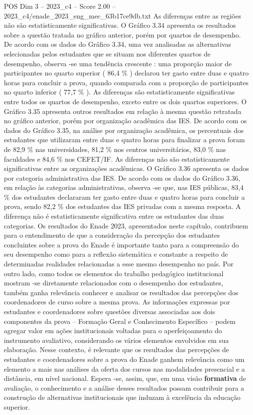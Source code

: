 \begin{textsample}{POS Dim 3 – 2023\_c4 – Score 2.00 – 2023\_c4/enade\_2023\_eng\_mec\_63b17ce9db.txt}
As diferenças entre as regiões não são estatisticamente significativas.
O Gráfico 3.34 apresenta os resultados sobre a questão tratada no gráfico anterior, porém por quartos de desempenho.
De acordo com os dados do Gráfico 3.34, uma vez analisadas as alternativas selecionadas pelos estudantes que se situam nos diferentes quartos de desempenho, observa -se uma tendência crescente : uma proporção maior de participantes no quarto superior ( 86,4 \% ) declarou ter gasto entre duas e quatro horas para concluir a prova, quando comparada com a proporção de participantes no quarto inferior ( 77,7 \% ).
As diferenças são estatisticamente significativas entre todos os quartos de desempenho, exceto entre os dois quartos superiores.
O Gráfico 3.35 apresenta outros resultados em relação à mesma questão retratada no gráfico anterior, porém por organização acadêmica das IES.
De acordo com os dados do Gráfico 3.35, na análise por organização acadêmica, os percentuais dos estudantes que utilizaram entre duas e quatro horas para finalizar a prova foram de 82,9 \% nas universidades, 81,2 \% nos centros universitários, 83,0 \% nas faculdades e 84,6 \% nos CEFET/IF.
As diferenças não são estatisticamente significativas entre as organizações acadêmicas.
O Gráfico 3.36 apresenta os dados por categoria administrativa das IES.
De acordo com os dados do Gráfico 3.36, em relação às categorias administrativas, observa -se que, nas IES públicas, 83,4 \% dos estudantes declararam ter gasto entre duas e quatro horas para concluir a prova, sendo 82,2 \% dos estudantes das IES privadas com a mesma resposta.
A diferença não é estatisticamente significativa entre os estudantes das duas categorias.
Os resultados do Enade 2023, apresentados neste capítulo, contribuem para o entendimento de que a consideração da percepção dos estudantes concluintes sobre a prova do Enade é importante tanto para a compreensão do seu desempenho como para a reflexão sistemática e constante a respeito de determinadas realidades relacionadas a esse mesmo desempenho no país.
Por outro lado, como todos os elementos do trabalho pedagógico institucional mostram -se diretamente relacionados com o desempenho dos estudantes, também ganha relevância conhecer e analisar os resultados das percepções dos coordenadores de curso sobre a mesma prova.
As informações expressas por estudantes e coordenadores sobre questões diversas associadas aos dois componentes da prova – Formação Geral e Conhecimento Específico – podem agregar valor em ações institucionais voltadas para o aperfeiçoamento do instrumento avaliativo, considerando os vários elementos envolvidos em sua elaboração.
Nesse contexto, é relevante que os resultados das percepções de estudantes e coordenadores sobre a prova do Enade ganhem relevância como um elemento a mais nas análises da oferta dos cursos nas modalidades presencial e a distância, em nível nacional.
Espera -se, assim, que, em uma visão \textbf{formativa} de avaliação, o conhecimento e a análise desses resultados possam contribuir para a construção de alternativas institucionais que induzam à excelência da educação superior.

\end{textsample}
